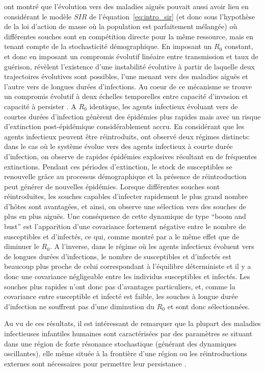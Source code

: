 \citet{Read2007} ont montré que l'évolution vers des maladies aiguës
pouvait aussi avoir lieu en considérant le modèle $SIR$ de
l'équation~\eqref{eq:intro_sir} (et donc sous l'hypothèse de la loi
d'action de masse où la population est parfaitement mélangée) où
différentes souches sont en compétition directe pour la même
ressource, mais en tenant compte de la stochasticité démographique. En
imposant un $R_0$ constant, et donc en imposant un compromis évolutif
linéaire entre transmission et taux de guérison, \citet{Read2007}
révèlent l'existence d'une instabilité évolutive à partir de laquelle
deux trajectoires évolutives sont possibles, l'une menant vers des
maladies aiguës et l'autre vers de longues durées d'infections. Au
coeur de ce mécanisme se trouve un compromis évolutif à deux échelles
temporelles entre capacité d'invasion et capacité à persister
\citep{Keeling2000}. A $R_0$ identique, les agents infectieux évoluant
vers de courtes durées d'infection génèrent des épidémies plus rapides
mais avec un risque d'extinction post-épidémique considérablement
accru. En considérant que les agents infectieux peuvent être
réintroduits, \citet{Read2007} ont observé deux régimes distincts:
dans le cas où le système évolue vers des agents infectieux à courte
durée d'infection, on observe de rapides épidémies explosives
résultant en de fréquentes extinctions. Pendant ces périodes
d'extinction, le stock de susceptibles se renouvelle grâce au
processus démographique et la présence de réintroduction peut générer
de nouvelles épidémies. Lorsque différentes souches sont
réintroduites, les souches capables d'infecter rapidement le plus
grand nombre d'hôtes sont avantagées, et ainsi, on observe une
sélection vers des souches de plus en plus aiguës. Une conséquence de
cette dynamique de type ``boom and bust'' est l'apparition d'une
covariance fortement négative entre le nombre de susceptibles et
d'infectés, ce qui, comme montré par \citet{Keeling2000} a le même
effet que de diminuer le $R_0$. A l'inverse, dans le régime où les
agents infectieux évoluent vers de longues durées d'infections, le
nombre de susceptibles et d'infectés est beaucoup plus proche de celui
correspondant à l'équilibre déterministe et il y a donc une covariance
négligeable entre les individus susceptibles et infectés. Les souches
plus rapides n'ont donc pas d'avantages particuliers, et, comme la
covariance entre susceptible et infecté est faible, les souches à
longue durée d'infection ne souffrent pas d'une diminution du $R_0$ et
sont donc sélectionnées.

Au vu de ces résultats, il est intéressant de remarquer que la plupart
des maladies infectieuses infantiles humaines sont caractérisées par
des paramètres se situant dans une région de forte résonance
stochastique (générant des dynamiques oscillantes), elle même située à
la frontière d'une région ou les réintroductions externes sont
nécessaires pour permettre leur persistance \citep{Alonso2007}.

